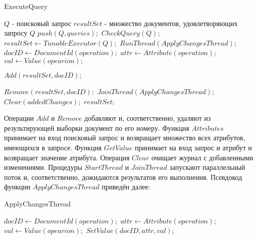 \documentclass{matmex-diploma}
\begin{document}
        \begin{algorithm}[H]
        \caption{ExecuteQuery}
        \label{exec1}
            \begin{algorithmic}
                \REQUIRE $Q$ - поисковый запрос
                \ENSURE $resultSet$ - множество документов, удовлетворяющих запросу $Q$
                \STATE $push(Q, queries);$
                \STATE $CheckQuery(Q);$
                \STATE $resultSet \leftarrow TunableExecutor(Q);$
                \STATE $RunThread(ApplyChangesThread);$
                    \STATE $docID \leftarrow DocumentId(operation);$
                    \STATE $attr \leftarrow Attribute(operation);$
                    \STATE $val \leftarrow Value(opearion);$
                    
                            \STATE $Add(resultSet, docID);$
                        \ENDIF
                        
                    \ENDIF
                    
                            \STATE $Remove(resultSet, docID);$
                        \ENDIF
                    \ENDIF
                \ENDFOR
                \STATE $JoinThread(ApplyChangesThread);$
                \STATE $Clear(addedChanges);$
                \RETURN $resultSet;$
            \end{algorithmic}
        \end{algorithm}
        
        Операции $Add$ и $Remove$ добавляют и, соответственно, удаляют из результирующей выборки документ по его номеру. Функция $Attributes$ принимает на вход поисковый запрос и возвращает множество всех атрибутов, имеющихся в запросе. Функция $GetValue$ принимает на вход запрос и атрибут и возвращает значение атрибута. Операция $Clear$ очищает журнал с добавленными изменениями. Процедуры $StartThread$ и $JoinThread$ запускают параллельный поток и, соответственно, дожидаются результатов его выполнения. Псевдокод функции $ApplyChangesThread$ приведён далее:
        
        \begin{algorithm}[H]
        \caption{ApplyChangesThread}
        \label{tranThread}
            \begin{algorithmic}
                        \STATE $docID \leftarrow DocumentId(operation);$
                        \STATE $attr \leftarrow Attribute(operation);$
                        \STATE $val \leftarrow Value(opearion);$
                        \STATE $SetValue(docID, attr, val);$
                    \ENDFOR
                \ENDIF
            \end{algorithmic}
        \end{algorithm}
        
\end{document}
